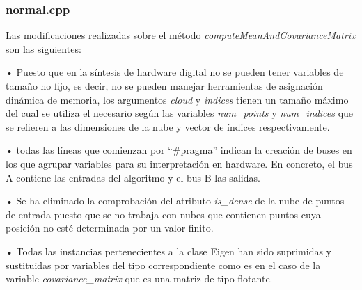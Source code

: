 \subsubsection{normal.cpp}

Las modificaciones realizadas sobre el método \textit{computeMeanAndCovarianceMatrix} son las siguientes:

\begin{list}{•}
\item[•] Puesto que en la síntesis de hardware digital no se pueden tener variables de tamaño no fijo, es decir, no se pueden manejar herramientas de asignación dinámica de memoria, los argumentos \textit{cloud} y \textit{indices} tienen un tamaño máximo del cual se utiliza el necesario según las variables \textit{num\_points} y \textit{num\_indices} que se refieren a las dimensiones de la nube y vector de índices respectivamente.

\item[•] todas las líneas que comienzan por ``\#pragma'' indican la creación de buses en los que agrupar variables para su interpretación en hardware. En concreto, el bus A contiene las entradas del algoritmo y el bus B las salidas. 

\item[•] Se ha eliminado la comprobación del atributo \textit{is\_dense} de la nube de puntos de entrada puesto que se no trabaja con nubes que contienen puntos cuya posición no esté determinada por un valor finito.

\item[•] Todas las instancias pertenecientes a la clase Eigen han sido suprimidas y sustituidas por variables del tipo correspondiente como es en el caso de la variable \textit{covariance\_matrix} que es una matriz de tipo flotante.

\end{list}

